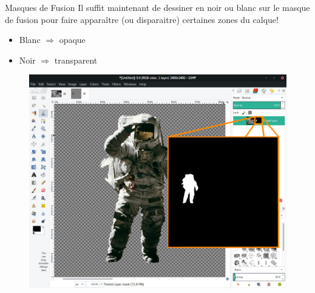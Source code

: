 	\begin{frame}{Masques de Fusion}
		Il suffit maintenant de dessiner en noir ou blanc sur le masque de fusion pour faire apparaître (ou disparaitre) certaines zones du calque!
		\begin{itemize}
			\item Blanc $\Longrightarrow $ opaque
			\item Noir $ \Longrightarrow $ transparent
		\end{itemize}
		\begin{center}
			\begin{figure}
				\includegraphics[scale=.15]{Images/mask/mask3}
			\end{figure}
		\end{center}
	\end{frame}

